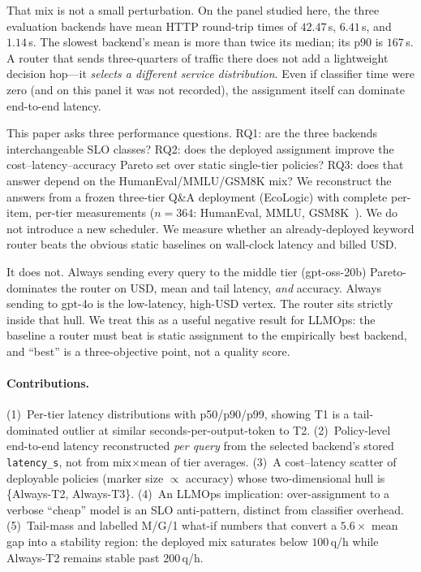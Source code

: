 \documentclass[10pt,conference]{IEEEtran}
\begin{document}
That mix is not a small perturbation. On the panel studied here, the three evaluation backends have mean HTTP round-trip times of $42.47$\,s, $6.41$\,s, and $1.14$\,s. The slowest backend's mean is more than twice its median; its p90 is $167$\,s. A router that sends three-quarters of traffic there does not add a lightweight decision hop---it \emph{selects a different service distribution}. Even if classifier time were zero (and on this panel it was not recorded), the assignment itself can dominate end-to-end latency.

This paper asks three performance questions. RQ1: are the three backends interchangeable SLO classes? RQ2: does the deployed assignment improve the cost--latency--accuracy Pareto set over static single-tier policies? RQ3: does that answer depend on the HumanEval/MMLU/GSM8K mix? We reconstruct the answers from a frozen three-tier Q\&A deployment (EcoLogic) with complete per-item, per-tier measurements ($n{=}364$: HumanEval, MMLU, GSM8K~\cite{chen2021humaneval,hendrycks2021mmlu,cobbe2021gsm8k}). We do not introduce a new scheduler. We measure whether an already-deployed keyword router beats the obvious static baselines on wall-clock latency and billed USD.

It does not. Always sending every query to the middle tier (gpt-oss-20b) Pareto-dominates the router on USD, mean and tail latency, \emph{and} accuracy. Always sending to gpt-4o is the low-latency, high-USD vertex. The router sits strictly inside that hull. We treat this as a useful negative result for LLMOps: the baseline a router must beat is static assignment to the empirically best backend, and ``best'' is a three-objective point, not a quality score.

\paragraph{Contributions.}
(1)~Per-tier latency distributions with p50/p90/p99, showing T1 is a tail-dominated outlier at similar seconds-per-output-token to T2.
(2)~Policy-level end-to-end latency reconstructed \emph{per query} from the selected backend's stored \texttt{latency\_s}, not from mix$\times$mean of tier averages.
(3)~A cost--latency scatter of deployable policies (marker size $\propto$ accuracy) whose two-dimensional hull is \{Always-T2, Always-T3\}.
(4)~An LLMOps implication: over-assignment to a verbose ``cheap'' model is an SLO anti-pattern, distinct from classifier overhead.
(5)~Tail-mass and labelled M/G/1 what-if numbers that convert a $5.6\times$ mean gap into a stability region: the deployed mix saturates below $100$\,q/h while Always-T2 remains stable past $200$\,q/h.
\end{document}
